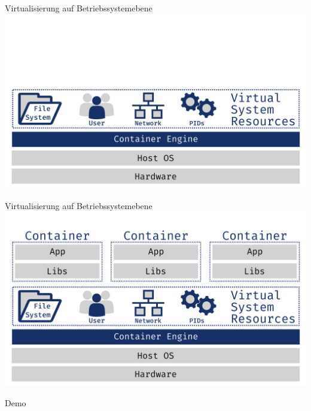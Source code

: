 \documentclass{beamer}
\begin{document}
  \begin{frame}{Virtualisierung auf Betriebssystemebene}
    \includegraphics[width=\textwidth]{os-virt}
  \end{frame}
  \begin{frame}{Virtualisierung auf Betriebssystemebene}
  	\includegraphics[width=\textwidth]{container}
  \end{frame}
  \begin{frame}[standout]
    Demo
  \end{frame}
\end{document}
